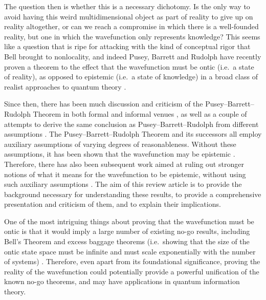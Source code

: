 \documentclass[DIV=calc,fontsize=12pt]{scrartcl} %
\theoremstyle{definition}
\theoremstyle{plain}
\begin{document}
The question then is whether this is a necessary dichotomy.  Is the
only way to avoid having this weird multidimensional object as part of
reality to give up on reality altogether, or can we reach a compromise
in which there is a well-founded reality, but one in which the
wavefunction only represents knowledge?  This seems like a question
that is ripe for attacking with the kind of conceptual rigor that Bell
brought to nonlocality, and indeed Pusey, Barrett and Rudolph have
recently proven a theorem to the effect that the wavefunction must be
ontic (i.e.\ a state of reality), as opposed to epistemic (i.e.\ a
state of knowledge) in a broad class of realist approaches to quantum
theory \cite{Pusey2012}.

Since then, there has been much discussion and criticism of the
Pusey--Barrett--Rudolph Theorem in both formal \cite{Bub2012,
  Bub2012a, Drezet2012, Drezet2012a, Emerson2013, Hall2011,
  Hofmann2011, Mansfield2013, Miller2013, Schlosshauer2013,
  Schlosshauer2012, Wallden2013} and informal venues
\cite{Aaronson2011, Griffiths2012, Leifer2011, Leifer2012a,
  Leifer2011a, Motl2011, Reich2012, Reich2011, Spekkens2012,
  Wallace2011}, as well as a couple of attempts to derive the same
conclusion as Pusey--Barrett--Rudolph from different assumptions
\cite{Colbeck2012, Hardy2013}.  The Pusey--Barrett--Rudolph Theorem
and its successors all employ auxiliary assumptions of varying degrees
of reasonableness.  Without these assumptions, it has been shown that
the wavefunction may be epistemic \cite{Lewis2012}.  Therefore, there
has also been subsequent work aimed at ruling out stronger notions of
what it means for the wavefunction to be epistemic, without using such
auxiliary assumptions \cite{Aaronson2013, Barrett2013, Branciard2014,
  Leifer2013c, Leifer2014, Maroney2012, Maroney2012a, Patra2013a}.
The aim of this review article is to provide the background necessary
for understanding these results, to provide a comprehensive
presentation and criticism of them, and to explain their implications.

One of the most intriguing things about proving that the wavefunction
must be ontic is that it would imply a large number of existing no-go
results, including Bell's Theorem \cite{Bell1964} and excess baggage
theorems (i.e.\ showing that
the size of the ontic state space must be infinite and must scale
exponentially with the number of systems) \cite{Hardy2004, Montina2008, Montina2011}.
Therefore, even apart from
its foundational significance, proving the reality of the wavefunction
could potentially provide a powerful unification of the known no-go
theorems, and may have applications in quantum information theory.
\end{document}

